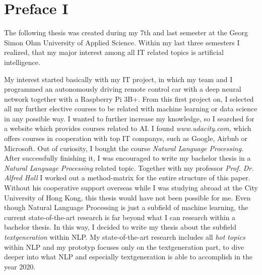\thispagestyle{empty}
\section*{Preface I}
\label{sec:prolog_1}

The following thesis was created during my 7th and last semester at the Georg Simon Ohm University of Applied Science. 
Within my last three semesters I realized, that my major interest among all IT related topics is artificial intelligence.

My interest started basically with my IT project, in which my team and I programmed an autonomously driving remote control car with a deep neural network together with a Raspberry Pi 3B+. From this first project on, I selected all my further elective courses to be related with machine learning or data science in any possible way. I wanted to further increase my knowledge, so I searched for a website which provides courses related to AI. I found \textit{www.udacity.com}, which offers courses in cooperation with top IT companys, such as Google, Airbnb or Microsoft. Out of curiosity, I bought the course \textit{Natural Language Processing}. After successfully finishing it, I was encouraged to write my bachelor thesis in a \textit{Natural Language Processing} related topic. 
Together with my professor \textit{Prof. Dr. Alfred Holl} I worked out a method-matrix for the entire structure of this paper. Without his cooperative support overseas while I was studying abroad at the City University of Hong Kong, this thesis would have not been possible for me.
Even though Natural Language Processing is just a subfield of machine learning, the current state-of-the-art research is far beyond what I can research within a bachelor thesis. In this way, I decided to write my thesis about the subfield \textit{textgeneration} within NLP. My state-of-the-art research includes all \textit{hot topics} within NLP and my prototyp focuses only on the textgeneration part, to dive deeper into what NLP and especially textgeneration is able to accomplish in the year 2020.

\null\newpage

